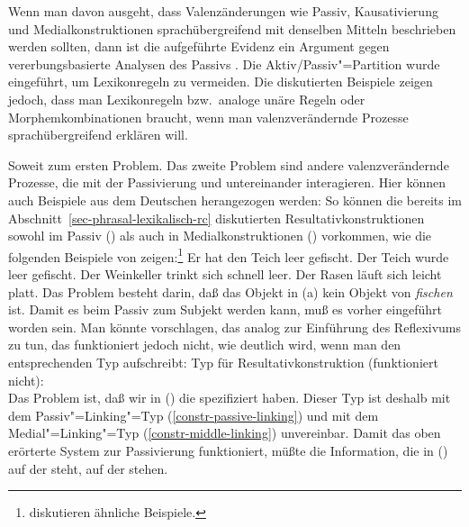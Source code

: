 Wenn man davon ausgeht, dass Valenzänderungen wie Passiv, Kausativierung und Medialkonstruktionen
sprachübergreifend mit denselben Mitteln beschrieben werden sollten, dann ist die aufgeführte
Evidenz ein Argument gegen vererbungsbasierte Analysen des Passivs
\citep{Mueller2006d,Mueller2007d}. Die Aktiv/Passiv"=Partition wurde eingeführt, um Lexikonregeln zu
vermeiden. Die diskutierten Beispiele zeigen jedoch, dass man Lexikonregeln bzw.\ analoge unäre
Regeln oder Morphemkombinationen braucht, wenn man valenzverändernde Prozesse sprachübergreifend
erklären will.

Soweit zum ersten Problem. Das zweite Problem sind andere valenzverändernde Prozesse,
die mit der Passivierung und untereinander interagieren. Hier können auch Beispiele aus dem Deutschen
herangezogen werden: So können \zb die bereits im Abschnitt~\ref{sec-phrasal-lexikalisch-rc} diskutierten
Resultativkonstruktionen sowohl im Passiv () als auch in Medialkonstruktionen ()
vorkommen, wie die folgenden Beispiele von \citet[]{Wunderlich97c} zeigen:\footnote{
        \citet[]{KR95a} diskutieren ähnliche Beispiele.%
}
\eal
\label{bsp-res-passiv-zwei}
\ex Er hat den Teich leer gefischt.
\ex Der Teich wurde leer gefischt.
\zl
\eal
\label{ex-res-nonselected-obj-passive}
\ex{}
Der Weinkeller  trinkt sich schnell leer.
\ex{}
Der Rasen läuft sich leicht platt.
\zl
Das Problem besteht darin, daß das Objekt in (a) kein Objekt von \emph{fischen} ist.
Damit es beim Passiv zum Subjekt werden kann, muß es vorher eingeführt worden sein. Man könnte
vorschlagen, das analog zur Einführung des Reflexivums zu tun, das funktioniert jedoch nicht,
wie deutlich wird, wenn man den entsprechenden Typ aufschreibt:
\ea
Typ für Resultativkonstruktion (funktioniert nicht):\\
\z
Das Problem ist, daß wir in () die \subcatl spezifiziert haben. Dieser
Typ ist deshalb mit dem Passiv"=Linking"=Typ (\ref{constr-passive-linking}) und mit dem
Medial"=Linking"=Typ (\ref{constr-middle-linking}) unvereinbar. Damit das oben erörterte System zur Passivierung
funktioniert, müßte die Information, die in () auf der \subcatl steht, auf der \argstl stehen.

